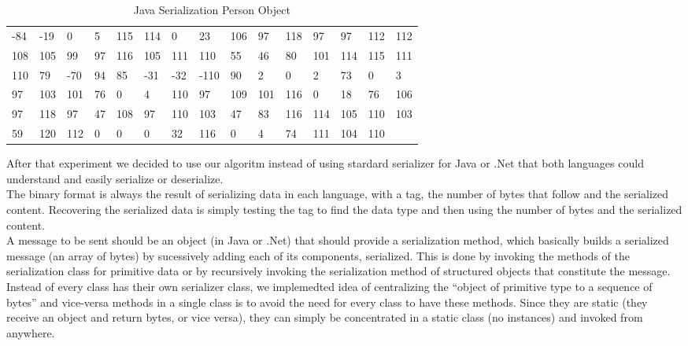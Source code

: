 \begin{table}[]
\centering
\begin{tabular}{lllllllllllllll}
  -84 & -19 & 0   & 5  & 115 & 114 & 0   & 23   & 106 & 97  & 118 & 97  & 97  & 112  & 112 \\
  108 & 105 & 99  & 97 & 116 & 105 & 111 & 110  & 55  & 46  & 80  & 101 & 114 & 115  & 111 \\
  110 & 79  & -70 & 94 & 85  & -31 & -32 & -110 & 90  & 2   & 0   & 2   & 73  & 0    & 3 \\
  97  & 103 & 101 & 76 & 0   & 4   & 110 & 97   & 109 & 101 & 116 & 0   & 18  & 76   & 106 \\
  97  & 118 & 97  & 47 & 108 & 97  & 110 & 103  & 47  & 83  & 116 & 114 & 105 & 110  & 103 \\
  59  & 120 & 112 & 0  & 0   & 0   & 32  & 116  & 0   & 4   & 74  & 111 & 104 & 110  &     \\
\end{tabular}
\caption[Java Serialization Person Object]{Java Serialization Person Object}
\label{tab:javaserilazitaon}
\end{table}

After that experiment we decided to use our algoritm instead of using stardard serializer for Java or .Net that both languages could understand and easily serialize or deserialize.\\

The binary format is always the result of serializing data in each language, with a tag, the number of bytes that follow and the serialized content. Recovering the serialized data is simply testing the tag to find the data type and then using the number of bytes and the serialized content.\\

A message to be sent should be an object (in Java or .Net) that should provide a serialization method, which basically builds a serialized message (an array of bytes) by sucessively adding each of its components, serialized. This is done by invoking the methods of the serialization class for primitive data or by recursively invoking the serialization method of structured objects that constitute the message.\\

Instead of every class has their own serializer class, we implemedted idea of centralizing the “object of primitive type to a sequence of bytes” and vice-versa methods in a single class is to avoid the need for every class to have these methods. Since they are static (they receive an object and return bytes, or vice versa), they can simply be concentrated in a static class (no instances) and invoked from anywhere.\\

